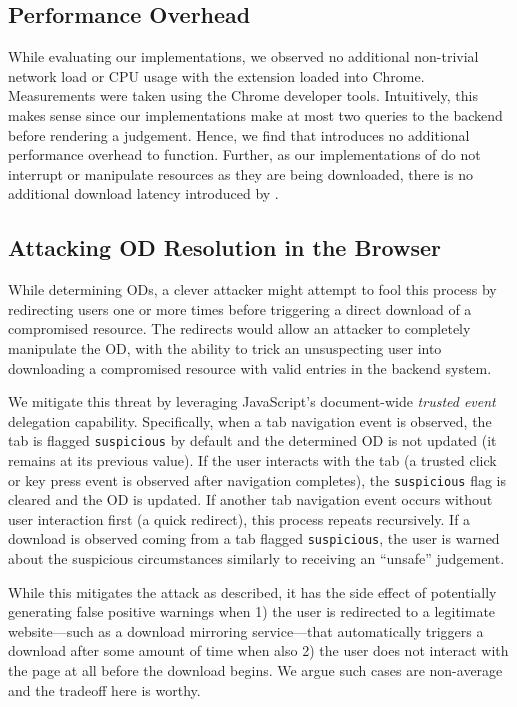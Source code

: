 \subsection{Performance Overhead}

While evaluating our \SYSTEM{} implementations, we observed no additional
non-trivial network load or CPU usage with the extension loaded into Chrome.
Measurements were taken using the Chrome developer tools. Intuitively, this
makes sense since our \SYSTEM{} implementations make at most two queries to the
backend before rendering a judgement. Hence, we find that \SYSTEM{} introduces
no additional performance overhead to function. Further, as our implementations
of \SYSTEM{} do not interrupt or manipulate resources as they are being
downloaded, there is no additional download latency introduced by \SYSTEM{}.

\subsection{Attacking OD Resolution in the Browser}

While determining ODs, a clever attacker might attempt to fool this process by
redirecting users one or more times before triggering a direct download of a
compromised resource. The redirects would allow an attacker to completely
manipulate the OD, with the ability to trick an unsuspecting user into
downloading a compromised resource with valid entries in the backend system.

We mitigate this threat by leveraging JavaScript's document-wide \emph{trusted
event}~\cite{TrustedEvents} delegation capability. Specifically, when a tab
navigation event is observed, the tab is flagged \texttt{suspicious} by default
and the determined OD is not updated (\ie it remains at its previous value). If
the user interacts with the tab (\ie a trusted click or key press event is
observed after navigation completes), the \texttt{suspicious} flag is cleared
and the OD is updated. If another tab navigation event occurs without user
interaction first (\eg a quick redirect), this process repeats recursively. If a
download is observed coming from a tab flagged \texttt{suspicious}, the user is
warned about the suspicious circumstances similarly to receiving an ``unsafe''
judgement.

While this mitigates the attack as described, it has the side effect of
potentially generating false positive warnings when 1) the user is redirected to
a legitimate website---such as a download mirroring service---that automatically
triggers a download after some amount of time when also 2) the user does not
interact with the page at all before the download begins. We argue such cases
are non-average and the tradeoff here is worthy.

